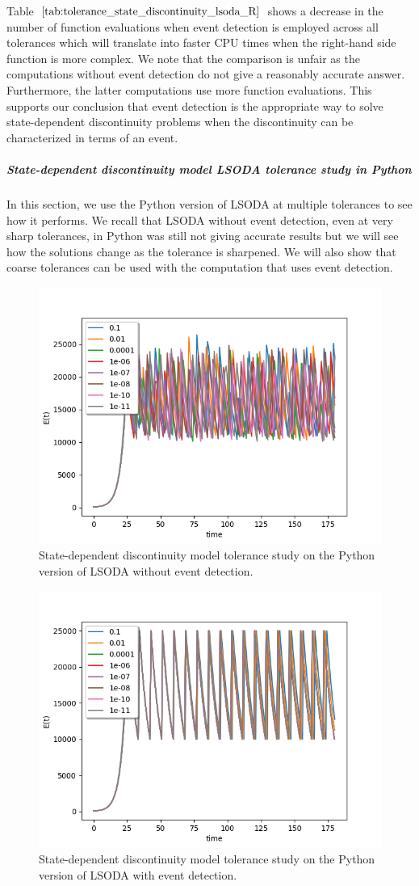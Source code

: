 Table $\ref{tab:tolerance_state_discontinuity_lsoda_R}$ shows a decrease in the number of function evaluations when event detection is employed across all tolerances which will translate into faster CPU times when the right-hand side function is more complex. We note that the comparison is unfair as the computations without event detection do not give a reasonably accurate answer. Furthermore, the latter computations use more function evaluations. This supports our conclusion that event detection is the appropriate way to solve state-dependent discontinuity problems when the discontinuity can be characterized in terms of an event.

\subparagraph{State-dependent discontinuity model LSODA tolerance study in Python}
In this section, we use the Python version of LSODA at multiple tolerances to see how it performs. We recall that LSODA without event detection, even at very sharp tolerances, in Python was still not giving accurate results but we will see how the solutions change as the tolerance is sharpened. We will also show that coarse tolerances can be used with the computation that uses event detection. 

\begin{figure}[h]
\centering
\includegraphics[width=0.7\linewidth]{./figures/tolerance_state_lsoda_no_event_py}
\caption{State-dependent discontinuity model tolerance study on the Python version of LSODA without event detection.}
\label{fig:tolerance_state_lsoda_no_event_py}
\end{figure}

\begin{figure}[h]
\centering
\includegraphics[width=0.7\linewidth]{./figures/tolerance_state_lsoda_with_event_py}
\caption{State-dependent discontinuity model tolerance study on the Python version of LSODA with event detection.}
\label{fig:tolerance_state_lsoda_with_event_py}
\end{figure}


